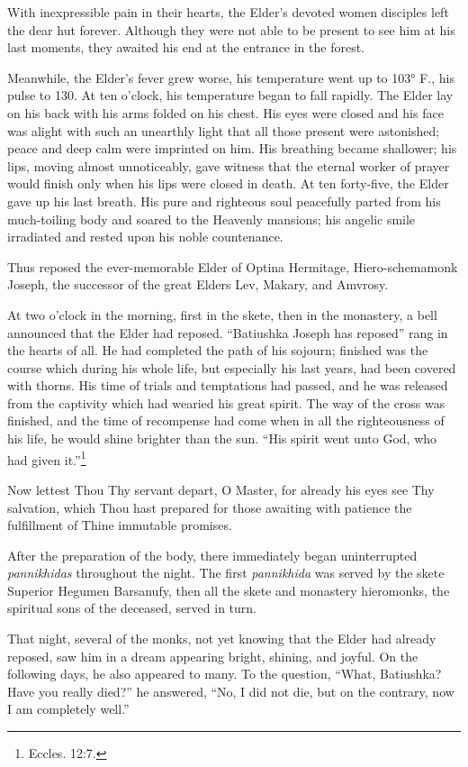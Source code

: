 With inexpressible pain in their hearts, the Elder's devoted women disciples left the dear hut forever. Although they were not able to be present to see him at his last moments, they awaited his end at the entrance in the forest.

Meanwhile, the Elder's fever grew worse, his temperature went up to 103° F., his pulse to 130. At ten o'clock, his temperature began to fall rapidly. The Elder lay on his back with his arms folded on his chest. His eyes were closed and his face was alight with such an unearthly light that all those present were astonished; peace and deep calm were imprinted on him. His breathing became shallower; his lips, moving almost unnoticeably, gave witness that the eternal worker of prayer would finish only when his lips were closed in death. At ten forty-five, the Elder gave up his last breath. His pure and righteous soul peacefully parted from his much-toiling body and soared to the Heavenly mansions; his angelic smile irradiated and rested upon his noble countenance.

Thus reposed the ever-memorable Elder of Optina Hermitage, Hiero-schemamonk Joseph, the successor of the great Elders Lev, Makary, and Amvrosy.

At two o'clock in the morning, first in the skete, then in the monastery, a bell announced that the Elder had reposed. ``Batiushka Joseph has reposed'' rang in the hearts of all. He had completed the path of his sojourn; finished was the course which during his whole life, but especially his last years, had been covered with thorns. His time of trials and temptations had passed, and he was released from the captivity which had wearied his great spirit. The way of the cross was finished, and the time of recompense had come when in all the righteousness of his life, he would shine brighter than the sun. ``His spirit went unto God, who had given it.''\footnote{Eccles. 12:7.}

Now lettest Thou Thy servant depart, O Master, for already his eyes see Thy salvation, which Thou hast prepared for those awaiting with patience the fulfillment of Thine immutable promises.

After the preparation of the body, there immediately began uninterrupted \textit{pannikhidas} throughout the night. The first \textit{pannikhida} was served by the skete Superior Hegumen Barsanufy, then all the skete and monastery hieromonks, the spiritual sons of the deceased, served in turn.

That night, several of the monks, not yet knowing that the Elder had already reposed, saw him in a dream appearing bright, shining, and joyful. On the following days, he also appeared to many. To the question, ``What, Batiushka? Have you really died?'' he answered, ``No, I did not die, but on the contrary, now I am completely well.''

